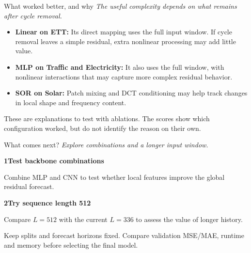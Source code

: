 \documentclass[aspectratio=169]{beamer}
\begin{document}
\begin{frame}{What worked better, and why}
\small
\textit{The useful complexity depends on what remains after cycle removal.}\par
\vspace{0.55em}
{\setlength{\fboxsep}{7pt}\setlength{\fboxrule}{0.45pt}%
\noindent\color{black}}
\vspace{0.75em}
\begin{itemize}
  \setlength{\itemsep}{0.65em}
  \item \textbf{Linear on ETT:} Its direct mapping uses the full input window. If cycle removal leaves a simple residual, extra nonlinear processing may add little value.
  \item \textbf{MLP on Traffic and Electricity:} It also uses the full window, with nonlinear interactions that may capture more complex residual behavior.
  \item \textbf{SOR on Solar:} Patch mixing and DCT conditioning may help track changes in local shape and frequency content.
\end{itemize}
\vspace{0.35em}
{\footnotesize\textcolor{muted}{These are explanations to test with ablations. The scores show which configuration worked, but do not identify the reason on their own.}}
\end{frame}

\begin{frame}{What comes next?}
\large
{\small\textit{Explore combinations and a longer input window.}}\par
\vspace{1.35em}
\textcolor{accent}{\textbf{1}}\quad \textbf{Test backbone combinations}
\par\vspace{0.45em}
{\normalsize Combine MLP and CNN to test whether local features improve the global residual forecast.}

\vspace{1.5em}
\textcolor{accent}{\textbf{2}}\quad \textbf{Try sequence length 512}
\par\vspace{0.45em}
{\normalsize Compare $L=512$ with the current $L=336$ to assess the value of longer history.}

\vspace{1.25em}
{\footnotesize\textcolor{muted}{Keep splits and forecast horizons fixed. Compare validation MSE/MAE, runtime and memory before selecting the final model.}}
\end{frame}
\end{document}
